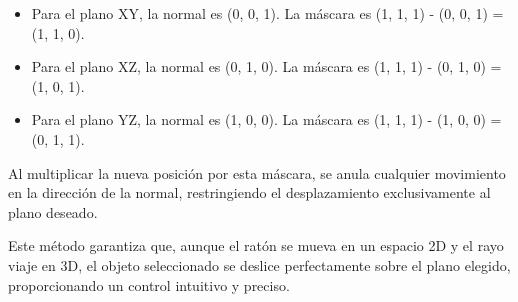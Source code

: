 \begin{enumerate}
          \begin{itemize}
              \item Para el plano XY, la normal es (0, 0, 1). La máscara es (1, 1, 1) - (0, 0, 1) =
                    (1, 1, 0).
              \item Para el plano XZ, la normal es (0, 1, 0). La máscara es (1, 1, 1) - (0, 1, 0) =
                    (1, 0, 1).
              \item Para el plano YZ, la normal es (1, 0, 0). La máscara es (1, 1, 1) - (1, 0, 0) =
                    (0, 1, 1).
          \end{itemize}
          Al multiplicar la nueva posición por esta máscara, se anula cualquier movimiento en la dirección de la normal, restringiendo el desplazamiento exclusivamente al plano deseado.
\end{enumerate}

Este método garantiza que, aunque el ratón se mueva en un espacio 2D y el rayo
viaje en 3D, el objeto seleccionado se deslice perfectamente sobre el plano
elegido, proporcionando un control intuitivo y preciso.